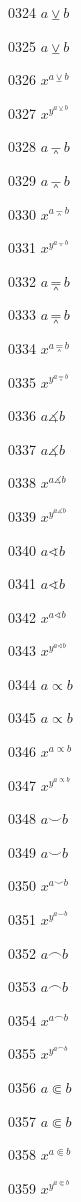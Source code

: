 \documentclass{article}
\begin{document}
0324 $a\veebar b$\par
0325 $\displaystyle a\veebar b$\par
0326 $x^{a\veebar b}$\par
0327 $x^{y^{a\veebar b}}$\par
0328 $a\barwedge b$\par
0329 $\displaystyle a\barwedge b$\par
0330 $x^{a\barwedge b}$\par
0331 $x^{y^{a\barwedge b}}$\par
0332 $a\doublebarwedge b$\par
0333 $\displaystyle a\doublebarwedge b$\par
0334 $x^{a\doublebarwedge b}$\par
0335 $x^{y^{a\doublebarwedge b}}$\par
0336 $a\measuredangle b$\par
0337 $\displaystyle a\measuredangle b$\par
0338 $x^{a\measuredangle b}$\par
0339 $x^{y^{a\measuredangle b}}$\par
0340 $a\sphericalangle b$\par
0341 $\displaystyle a\sphericalangle b$\par
0342 $x^{a\sphericalangle b}$\par
0343 $x^{y^{a\sphericalangle b}}$\par
0344 $a\varpropto b$\par
0345 $\displaystyle a\varpropto b$\par
0346 $x^{a\varpropto b}$\par
0347 $x^{y^{a\varpropto b}}$\par
0348 $a\smallsmile b$\par
0349 $\displaystyle a\smallsmile b$\par
0350 $x^{a\smallsmile b}$\par
0351 $x^{y^{a\smallsmile b}}$\par
0352 $a\smallfrown b$\par
0353 $\displaystyle a\smallfrown b$\par
0354 $x^{a\smallfrown b}$\par
0355 $x^{y^{a\smallfrown b}}$\par
0356 $a\Subset b$\par
0357 $\displaystyle a\Subset b$\par
0358 $x^{a\Subset b}$\par
0359 $x^{y^{a\Subset b}}$\par
\end{document}
